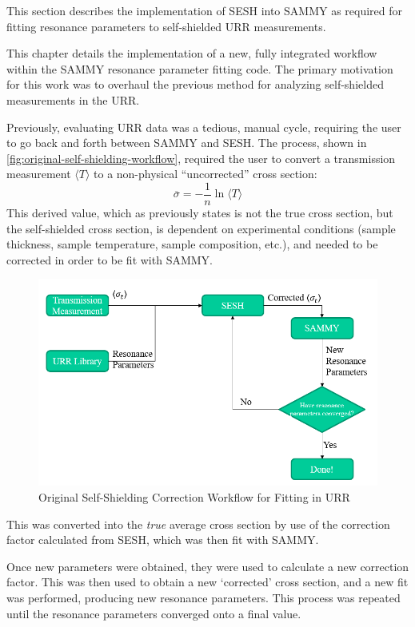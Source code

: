 This section describes the implementation of SESH into SAMMY as required for fitting resonance parameters to self-shielded URR measurements.

This chapter details the implementation of a new, fully integrated workflow within the SAMMY resonance parameter fitting code. The primary motivation for this work was to overhaul the previous method for analyzing self-shielded measurements in the URR. 

Previously, evaluating URR data was a tedious, manual cycle, requiring the user to go back and forth between SAMMY and SESH. The process, shown in \autoref{fig:original-self-shielding-workflow}, required the user to convert a transmission measurement $\langle T \rangle$ to a non-physical ``uncorrected'' cross section:
\begin{equation}
    \overline{\sigma} = -\frac{1}{n} \ln{ \langle T \rangle}
\end{equation}
This derived value, which as previously states is not the true cross section, but the self-shielded cross section, is dependent on experimental conditions (sample thickness, sample temperature, sample composition, etc.), and needed to be corrected in order to be fit with SAMMY.
\begin{figure}
    \centering
    \includegraphics[width=0.75\linewidth]{Implementation/Figures/SelfShieldingWorkflow.png}
    \caption{Original Self-Shielding Correction Workflow for Fitting in URR}
    \label{fig:original-self-shielding-workflow}
\end{figure}
This was converted into the \textit{true} average cross section by use of the correction factor calculated from SESH, which was then fit with SAMMY.

Once new parameters were obtained, they were used to calculate a new correction factor. This was then used to obtain a new `corrected' cross section, and a new fit was performed, producing new resonance parameters. This process was repeated until the resonance parameters converged onto a final value.

